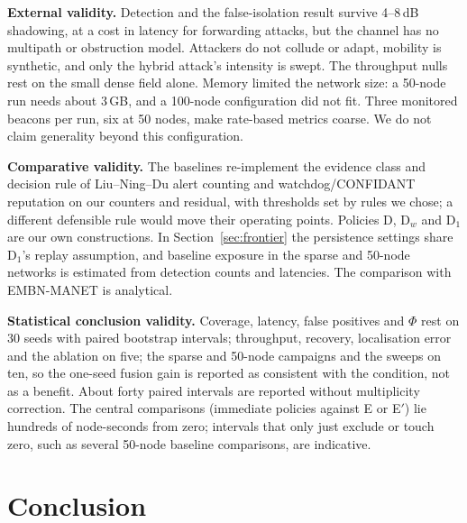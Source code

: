 \documentclass[pdflatex,sn-mathphys-num]{sn-jnl}%
\theoremstyle{thmstyleone}%
\theoremstyle{thmstyletwo}%
\theoremstyle{thmstylethree}%
\begin{document}
\textbf{External validity.} Detection and the false-isolation result survive
4--8\,dB shadowing, at a cost in latency for forwarding attacks, but the
channel has no multipath or obstruction model. Attackers do not collude or
adapt, mobility is synthetic, and only the hybrid attack's intensity is swept.
The throughput nulls rest on the small dense field alone. Memory limited the
network size: a 50-node run needs about 3\,GB, and a 100-node configuration
did not fit. Three monitored beacons per run, six at 50 nodes, make
rate-based metrics coarse. We do not claim generality beyond this
configuration.

\textbf{Comparative validity.} The baselines re-implement the evidence class
and decision rule of Liu--Ning--Du alert counting and watchdog/CONFIDANT
reputation on our counters and residual, with thresholds set by rules we
chose; a different defensible rule would move their operating points. Policies
D, D$_w$ and D$_1$ are our own constructions. In Section~\ref{sec:frontier}
the persistence settings share D$_1$'s replay assumption, and baseline
exposure in the sparse and 50-node networks is estimated from detection counts
and latencies. The comparison with EMBN-MANET is analytical.

\textbf{Statistical conclusion validity.} Coverage, latency, false positives
and $\Phi$ rest on 30 seeds with paired bootstrap intervals; throughput,
recovery, localisation error and the ablation on five; the sparse and 50-node
campaigns and the sweeps on ten, so the one-seed fusion gain is reported as
consistent with the condition, not as a benefit. About forty paired intervals
are reported without multiplicity correction. The central comparisons
(immediate policies against E or E$'$) lie hundreds of node-seconds from zero;
intervals that only just exclude or touch zero, such as several 50-node
baseline comparisons, are indicative.

\section{Conclusion}
\label{sec:conclusion}
\end{document}
